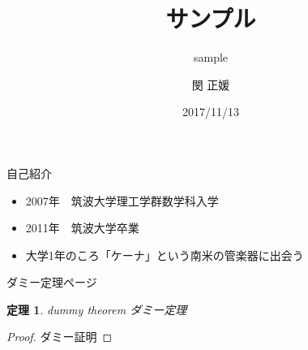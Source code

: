 \documentclass[dvipdfmx,11pt]{beamer}
\title{サンプル}
\subtitle{sample}
\author{閔 正媛}
\date{2017/11/13}
\theoremstyle{plain}
\newtheorem{theo}{定理}
\begin{document}
\begin{frame}
	\titlepage
\end{frame}

\begin{frame}{自己紹介}
\begin{itemize}
\item 2007年　筑波大学理工学群数学科入学
\item 2011年　筑波大学卒業
\item 大学1年のころ「ケーナ」という南米の管楽器に出会う
\end{itemize}
\end{frame}

\begin{frame}{ダミー定理ページ}
\begin{theo}
dummy theorem ダミー定理
\end{theo}
\begin{proof}
ダミー証明
\end{proof}
\end{frame}
\end{document}
